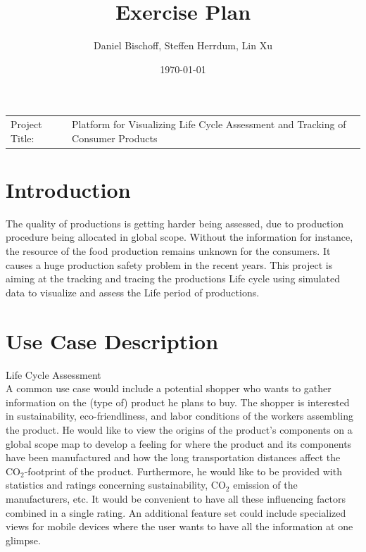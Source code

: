\documentclass[a4page]{article}
\author{Daniel Bischoff, Steffen Herrdum, Lin Xu}
\title{Exercise Plan}
\date{\today}
\begin{document}
\maketitle

\begin{table}[!th]
\begin{tabular}{l p{}}

Project Title: & Platform for Visualizing Life Cycle Assessment and Tracking of Consumer Products \\

\end{tabular}
\end{table}

\section{Introduction}
The quality of productions is getting harder being assessed, due to production procedure being allocated in global scope.
Without the information for instance, the resource of the food production remains unknown for the consumers.
It causes a huge production safety problem in the recent years.
This project is aiming at the tracking and tracing the productions Life cycle using simulated data to visualize and assess the Life period of productions. 

\section{Use Case Description}

Life Cycle Assessment\\
A common use case would include a potential shopper who wants to gather information on the (type of) product he plans to buy.
The shopper is interested in sustainability, eco-friendliness, and labor conditions of the workers assembling the product.
He would like to view the origins of the product's components on a global scope map to develop a feeling for where the product and its components have been manufactured and how the long transportation distances affect the $\mathrm{CO}_2$-footprint of the product.
Furthermore, he would like to be provided with statistics and ratings concerning sustainability, $\mathrm{CO}_2$ emission of the manufacturers, etc.
It would be convenient to have all these influencing factors combined in a single rating.
An additional feature set could include specialized views for mobile devices where the user wants to have all the information at one glimpse.
\end{document}
